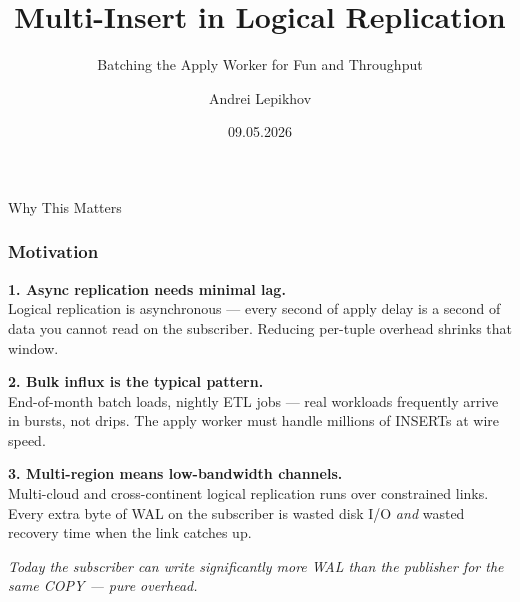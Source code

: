 \documentclass{beamer}
\title{Multi-Insert in Logical Replication}
\subtitle{Batching the Apply Worker for Fun and Throughput}
\author{Andrei Lepikhov}
\institute{pgEdge}
\date{09.05.2026}
\begin{document}

\begin{frame}
\titlepage
\end{frame}


\begin{frame}
\vspace*{\fill}\begin{center}
\huge{Why This Matters}
\end{center}\vspace*{\fill}
\end{frame}

\begin{frame}\frametitle{Motivation}
\textbf{1. Async replication needs minimal lag.}\\
Logical replication is asynchronous --- every second of apply delay
is a second of data you cannot read on the subscriber.
Reducing per-tuple overhead shrinks that window.

\bigskip
\textbf{2. Bulk influx is the typical pattern.}\\
End-of-month batch loads, nightly ETL jobs ---
real workloads frequently arrive in bursts, not drips.
The apply worker must handle millions of INSERTs at wire speed.

\bigskip
\textbf{3. Multi-region means low-bandwidth channels.}\\
Multi-cloud and cross-continent logical replication runs over
constrained links. Every extra byte of WAL on the subscriber is
wasted disk I/O \textit{and} wasted recovery time when the link catches up.

\bigskip
{\small\textit{Today the subscriber can write significantly more WAL than the publisher
for the same COPY --- pure overhead.}}
\end{frame}


\end{document}
